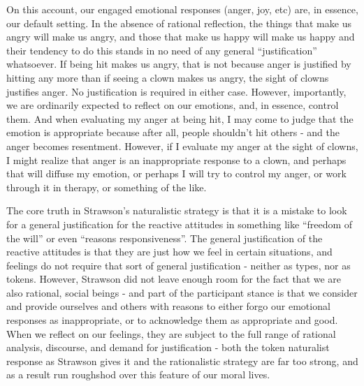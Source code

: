 \documentclass[phd,12pt,oneside,paper=letterpaper]{ubcthesis}
\begin{document}
On this account, our engaged emotional responses (anger, joy, etc) are, in essence, our default setting. In the absence of rational reflection, the things that make us angry will make us angry, and those that make us happy will make us happy and their tendency to do this stands in no need of any general ``justification'' whatsoever. If being hit makes us angry, that is not because anger is justified by hitting any more than if seeing a clown makes us angry, the sight of clowns justifies anger. No justification is required in either case. However, importantly, we are ordinarily expected to reflect on our emotions, and, in essence, control them. And when evaluating my anger at being hit, I may come to judge that the emotion is appropriate because after all, people shouldn't hit others - and the anger becomes resentment. However, if I evaluate my anger at the sight of clowns, I might realize that anger is an inappropriate response to a clown, and perhaps that will diffuse my emotion, or perhaps I will try to control my anger, or work through it in therapy, or something of the like. 

The core truth in Strawson's naturalistic strategy is that it is a mistake to look for a general justification for the reactive attitudes in something like ``freedom of the will'' or even ``reasons responsiveness''. The general justification of the reactive attitudes is that they are just how we feel in certain situations, and feelings do not require that sort of general justification - neither as types, nor as tokens. However, Strawson did not leave enough room for the fact that we are also rational, social beings - and part of the participant stance is that we consider and provide ourselves and others with reasons to either forgo our emotional responses as inappropriate, or to acknowledge them as appropriate and good. When we reflect on our feelings, they are subject to the full range of rational analysis, discourse, and demand for justification - both the token naturalist response as Strawson gives it and the rationalistic strategy are far too strong, and as a result run roughshod over this feature of our moral lives. 
\end{document}
